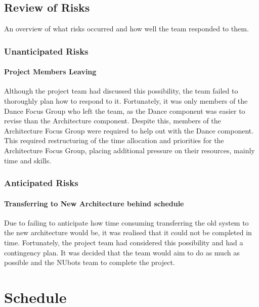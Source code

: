 \documentclass[english,12pt]{scrartcl}
\begin{document}
		\subsection{Review of Risks}
			An overview of what risks occurred and how well the team responded to them.

			\subsubsection{Unanticipated Risks}
				\paragraph{Project Members Leaving}
					Although the project team had discussed this possibility, the team failed to thoroughly plan how to respond to it.
					Fortunately, it was only members of the Dance Focus Group who left the team, as the Dance component was easier to revise than the Architecture component.
					Despite this, members of the Architecture Focus Group were required to help out with the Dance component.
					This required restructuring of the time allocation and priorities for the Architecture Focus Group, placing additional pressure on their resources, mainly time and skills.

			\subsubsection{Anticipated Risks}
				\paragraph{Transferring to New Architecture behind schedule}
					Due to failing to anticipate how time consuming transferring the old system to the new architecture would be, it was realised that it could not be completed in time.
					Fortunately, the project team had considered this possibility and had a contingency plan.
					It was decided that the team would aim to do as much as possible and the NUbots team to complete the project.

	\section{Schedule}
\end{document}
